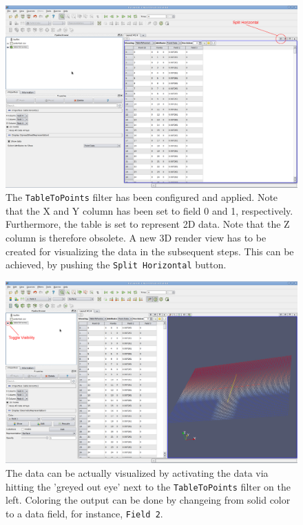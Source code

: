 \begin{figure}[!ht]
\includegraphics[width=0.9\columnwidth]{figures/para4.eps}
\caption{
The \texttt{TableToPoints} filter has been configured and applied.
Note that the X and Y column has been set to field 0 and 1, respectively.
Furthermore, the table is set to represent 2D data. Note that the Z column is therefore
obsolete.
A new 3D render view has to be created for visualizing the data in the subsequent steps.
This can be achieved, by pushing the \texttt{Split Horizontal} button.
}
\label{fig:para4}
\end{figure}

\begin{figure}[!ht]
\includegraphics[width=0.9\columnwidth]{figures/para5.eps}
\caption{
The data can be actually visualized by activating the data via
hitting the 'greyed out eye' next to the \texttt{TableToPoints} filter on the left.
Coloring the output can be done by changeing from solid color to a data field, for instance, \texttt{Field 2}.
}
\label{fig:para5}
\end{figure}

